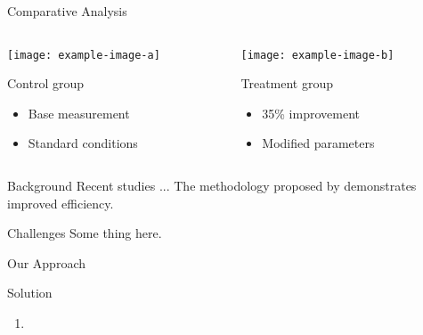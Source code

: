 \documentclass[handout,t,aspectratio=1610]{beamer}
\begin{document}
    \begin{frame}{Comparative Analysis}
        \begin{columns}[T]
            \begin{column}{0.48\textwidth}
                \centering
                \texttt{[image: example-image-a]}

                \vspace{0.3em}
                {\small Control group}

                \begin{itemize}
                    \item Base measurement
                    \item Standard conditions
                \end{itemize}
            \end{column}
            \begin{column}{0.48\textwidth}
                \centering
                \texttt{[image: example-image-b]}

                \vspace{0.3em}
                {\small Treatment group}

                \begin{itemize}
                    \item 35\% improvement
                    \item Modified parameters
                \end{itemize}
            \end{column}
        \end{columns}
    \end{frame}

    \begin{frame}{Background}
        Recent studies ... The methodology proposed by \cite{zhang2024} demonstrates improved efficiency.
    \end{frame}

    \begin{frame}{Challenges}
        Some thing here.
    \end{frame}


    \begin{frame}{Our Approach}
        \begin{block}{Solution}
            \begin{enumerate}
                \item
            \end{enumerate}
        \end{block}
    \end{frame}
\end{document}
